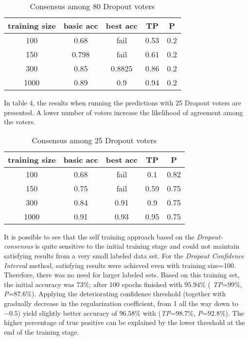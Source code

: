 \documentclass[conference, letterpaper]{IEEEtran}
\begin{document}
 \begin{table}
 \begin{center}
\begin{tabular}{|c|c|c|c|c|}\hline
training size & basic acc  & best acc & TP & P \\ \hline\hline
100  & 0.68  &  fail  & 0.53 & 0.2\\
150  & 0.798 &  fail  & 0.61 & 0.2\\
300  & 0.85  & 0.8825 & 0.86 & 0.2\\
1000 & 0.89  & 0.9 & 0.94 & 0.2 \\ \hline
\end{tabular}
\end{center}
\caption{Consensus among 80 Dropout voters}
\label{table:3}
\end{table}

In table 4, the results when running the predictions with 25 Dropout voters are presented. A lower number of voters increase the likelihood of agreement among the voters.

\begin{table}
\begin{center}
\begin{tabular}{|c|c|c|c|c|}\hline
training size & basic acc  & best acc & TP & P \\ \hline\hline
100 & 0.68 & fail & 0.1 & 0.82\\
150 & 0.75 & fail & 0.59 & 0.75 \\
300 & 0.84 & 0.91 & 0.9 & 0.75\\
1000 & 0.91 & 0.93 & 0.95& 0.75 \\ \hline
\end{tabular}
\end{center}
\caption{Consensus among 25 Dropout voters}
\label{table:4}
\end{table}

It is possible to see that the self training approach based on the \textit{Dropout-consensus} is quite sensitive to the initial training stage and could not maintain satisfying results from a very small labeled data set.
For the \textit{Dropout Confidence Interval} method, satisfying results were achieved even with training size=100. Therefore, there was no need for larger labeled sets. Based on this training set, the initial accuracy was  $73\%$; after 100 epochs finished with $95.94\%$ (
\textit{TP}=$99\%$, \textit{P}=$87.6\%$). Applying the deteriorating confidence threshold (together with gradually decrease in the regularization coefficient, from 1 all the way down to $-0.5$) yield slightly better accuracy of $96.58\%$ with (\textit{TP}=$98.7\%$, \textit{P}=$92.8\%$). The higher percentage of true positive can be explained by the lower threshold at the end of the training stage.
\end{document}
